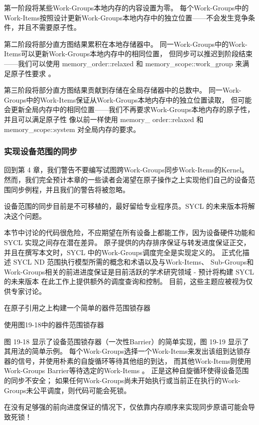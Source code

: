 第一阶段将某些Work-Groups本地内存的内容设置为零。 
每个Work-Groups中的Work-Items按照设计更新Work-Groups本地内存中的独立位置——不会发生竞争条件，并且不需要原子性。

第二阶段将部分直方图结果累积在本地存储器中。 
同一Work-Groups中的Work-Items可以更新Work-Groups本地内存中的相同位置，
但同步可以推迟到阶段结束——我们可以使用 memory\_order::relaxed 
和 memory\_scope::work\_group 来满足原子性要求 。

第三阶段将部分直方图结果贡献到存储在全局存储器中的总数中。 
同一Work-Groups中的Work-Items保证从Work-Groups本地内存中的独立位置读取，
但可能会更新全局内存中的相同位置——我们不再要求Work-Groups本地内存的原子性，
并且可以满足原子性 像以前一样使用 memory\_ order::relaxed 和 memory\_scope::system 对全局内存的要求。

\subsubsection{实现设备范围的同步}
回到第 4 章，我们警告不要编写试图跨Work-Groups同步Work-Items的Kernel。 
然而，我们完全预计本章的一些读者会渴望在原子操作之上实现他们自己的设备范围同步例程，并且我们的警告将被忽略。

\begin{remark}
	设备范围的同步目前是不可移植的，最好留给专业程序员。SYCL 的未来版本将解决这个问题。
\end{remark}

本节中讨论的代码很危险，不应期望在所有设备上都能工作，因为设备硬件功能和 SYCL 实现之间存在潜在差异。 
原子提供的内存排序保证与转发进度保证正交，并且在撰写本文时，SYCL 中的Work-Groups调度完全是实现定义的。 
正式化描述 SYCL ND 范围执行模型所需的概念和术语以及与Work-Items、
Sub-Groups和Work-Groups相关的前进进度保证是目前活跃的学术研究领域 - 
预计将构建 SYCL 的未来版本 在此工作上提供额外的调度查询和控制。 目前，这些主题应被视为仅供专家讨论。

{\color{red} 在原子引用之上构建一个简单的器件范围锁存器}

{\color{red} 使用图19-18中的器件范围锁存器}

图 19-18 显示了设备范围锁存器（一次性Barrier）的简单实现，图 19-19 显示了其用法的简单示例。 
每个Work-Groups选择一个Work-Items来发出该组到达锁存器的信号，并使用朴素的自旋循环等待其他组的到达，
而其他Work-Items则使用Work-Groups Barrier等待选定的Work-Items 。 
正是这种自旋循环使得设备范围的同步不安全； 
如果任何Work-Groups尚未开始执行或当前正在执行的Work-Groups未公平调度，则代码可能会死锁。

\begin{remark}
	在没有足够强的前向进度保证的情况下，仅依靠内存顺序来实现同步原语可能会导致死锁！
\end{remark}

